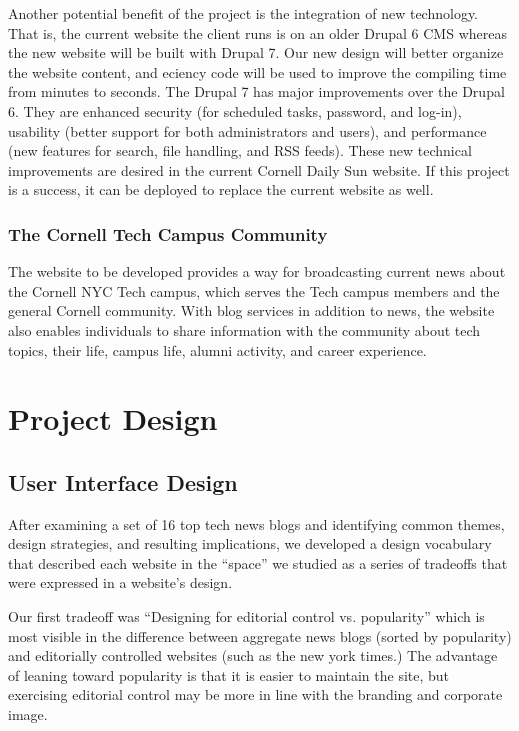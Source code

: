 \documentclass[11pt]{article} %
\begin{document}
Another potential benefit of the project is the integration of new technology. That is, the current website the client runs is on an older Drupal 6 CMS whereas the new website will be built with Drupal 7. Our new design will better organize the website content, and eciency code will be used to improve the compiling time from minutes to seconds. The Drupal 7 has major improvements over the Drupal 6. They are enhanced security (for scheduled tasks, password, and log-in), usability (better support for both administrators and users), and performance (new features for search, file handling, and RSS feeds). These new technical improvements are desired in the current Cornell Daily Sun website. If this project is a success, it can be deployed to replace the current website as well.
                   
\subsubsection{The Cornell Tech Campus Community}
                   
The website to be developed provides a way for broadcasting current news about the Cornell NYC Tech campus, which serves the Tech campus members and the general Cornell community. With blog services in addition to news, the website also enables individuals to share information with the community about tech topics, their life, campus life, alumni activity, and career experience. 

\section{Project Design}

\subsection{User Interface Design}

After examining a set of 16 top tech news blogs and identifying common themes, design strategies, and resulting implications, we developed a design vocabulary that described each website in the “space” we studied as a series of tradeoffs that were expressed in a website’s design.
                
Our first tradeoff was “Designing for editorial control vs. popularity” which is most visible in the difference between aggregate news blogs (sorted by popularity) and editorially controlled websites (such as the new york times.) The advantage of leaning toward popularity is that it is easier to maintain the site, but exercising editorial control may be more in line with the branding and corporate image.
                
\end{document}
